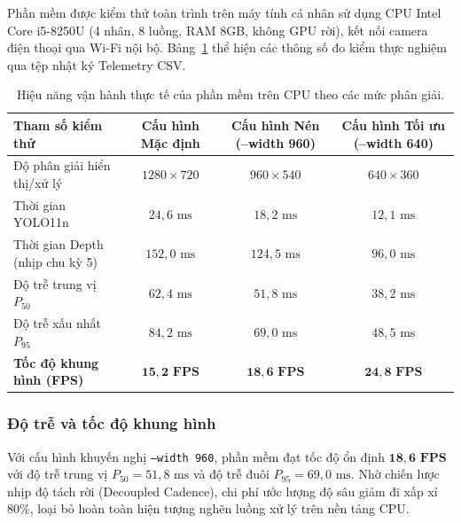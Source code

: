 Phần mềm được kiểm thử toàn trình trên máy tính cá nhân sử dụng CPU Intel Core i5-8250U (4 nhân, 8 luồng, RAM 8GB, không GPU rời), kết nối camera điện thoại qua Wi-Fi nội bộ. Bảng~\ref{tab:software_runtime_benchmark} thể hiện các thông số đo kiểm thực nghiệm qua tệp nhật ký Telemetry CSV.

\begin{table}[htbp]
\centering
\caption{Hiệu năng vận hành thực tế của phần mềm trên CPU theo các mức phân giải.}
\label{tab:software_runtime_benchmark}
\begin{tabular}{|l|c|c|c|}
\hline
\textbf{Tham số kiểm thử} & \textbf{Cấu hình Mặc định} & \textbf{Cấu hình Nén (--width 960)} & \textbf{Cấu hình Tối ưu (--width 640)} \\ \hline
Độ phân giải hiển thị/xử lý & $1280 \times 720$ & $960 \times 540$ & $640 \times 360$ \\ \hline
Thời gian YOLO11n & $24,6\text{ ms}$ & $18,2\text{ ms}$ & $12,1\text{ ms}$ \\ \hline
Thời gian Depth (nhịp chu kỳ 5) & $152,0\text{ ms}$ & $124,5\text{ ms}$ & $96,0\text{ ms}$ \\ \hline
Độ trễ trung vị $P_{50}$ & $62,4\text{ ms}$ & $51,8\text{ ms}$ & $38,2\text{ ms}$ \\ \hline
Độ trễ xấu nhất $P_{95}$ & $84,2\text{ ms}$ & $69,0\text{ ms}$ & $48,5\text{ ms}$ \\ \hline
\textbf{Tốc độ khung hình (FPS)} & $\mathbf{15,2\text{ FPS}}$ & $\mathbf{18,6\text{ FPS}}$ & $\mathbf{24,8\text{ FPS}}$ \\ \hline
\end{tabular}
\end{table}

\subsubsection{Độ trễ và tốc độ khung hình}
Với cấu hình khuyến nghị \texttt{--width 960}, phần mềm đạt tốc độ ổn định $\mathbf{18,6\text{ FPS}}$ với độ trễ trung vị $P_{50} = 51,8\text{ ms}$ và độ trễ đuôi $P_{95} = 69,0\text{ ms}$. Nhờ chiến lược nhịp độ tách rời (Decoupled Cadence), chi phí ước lượng độ sâu giảm đi xấp xỉ $80\%$, loại bỏ hoàn toàn hiện tượng nghẽn luồng xử lý trên nền tảng CPU.

